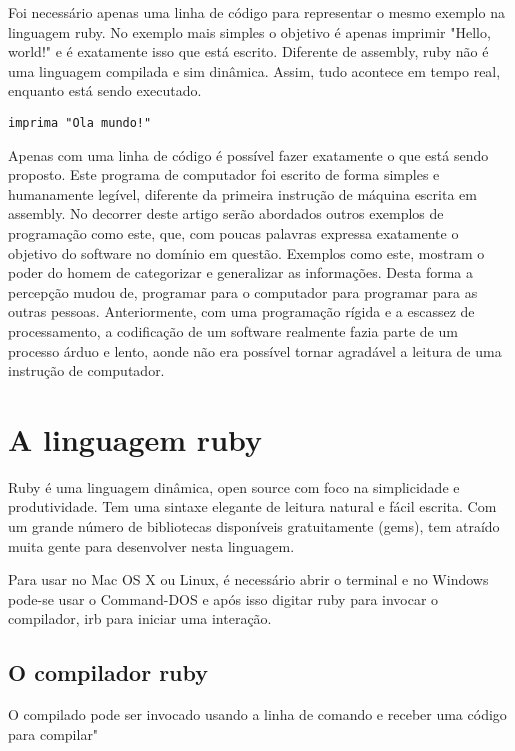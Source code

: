 \documentclass[12pt]{article}
\begin{document}
Foi necessário apenas uma linha de código para representar o mesmo exemplo na linguagem ruby. No exemplo mais simples o objetivo é apenas imprimir "Hello, world!" e é exatamente isso que está escrito. Diferente de assembly, ruby não é uma linguagem compilada e sim dinâmica. Assim, tudo acontece em tempo real, enquanto está sendo executado.
   
\begin{lstlisting}[caption=Tradução do programa ruby]
   imprima "Ola mundo!"
\end{lstlisting}

Apenas com uma linha de código é possível fazer exatamente o que está sendo proposto. Este programa de computador foi escrito de forma simples e humanamente legível, diferente da primeira instrução de máquina escrita em assembly. No decorrer deste artigo serão abordados outros exemplos de programação como este, que, com poucas palavras expressa exatamente o objetivo do software no domínio em questão.
Exemplos como este, mostram o poder do homem de categorizar e generalizar as informações. Desta forma a percepção mudou de, programar para o computador para programar para as outras pessoas. Anteriormente, com uma programação rígida e a escassez de processamento, a codificação de um software realmente fazia parte de um processo árduo e lento, aonde não era possível tornar agradável a leitura de uma instrução de computador.



\section { A linguagem ruby }

Ruby é uma linguagem dinâmica, open source com foco na simplicidade e produtividade. Tem uma sintaxe elegante de leitura natural e fácil escrita. Com um grande número de bibliotecas disponíveis gratuitamente (gems), tem atraído muita gente para desenvolver nesta linguagem.

Para usar no Mac OS X ou Linux, é necessário abrir o {terminal} e  no Windows pode-se usar o Command-DOS e após isso digitar ruby para invocar o compilador, irb para iniciar uma interação.

\subsection { O compilador ruby }

O compilado pode ser invocado usando a linha de comando e receber uma código para compilar"
\end{document}
